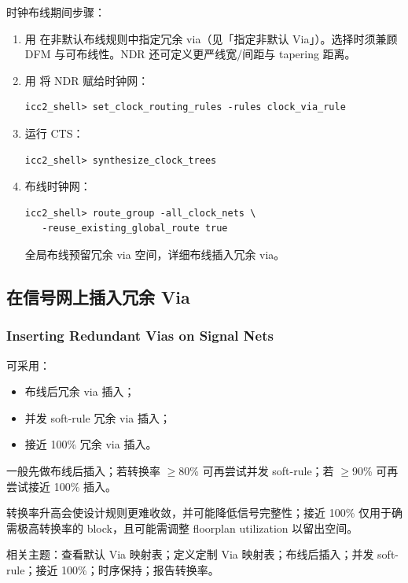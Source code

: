 时钟布线期间步骤：
\begin{enumerate}
  \item 用  在非默认布线规则中指定冗余 via（见「指定非默认 Via」）。选择时须兼顾 DFM 与可布线性。NDR 还可定义更严线宽/间距与 tapering 距离。
  \item 用  将 NDR 赋给时钟网：
\begin{lstlisting}
icc2_shell> set_clock_routing_rules -rules clock_via_rule
\end{lstlisting}
  \item 运行 CTS：
\begin{lstlisting}
icc2_shell> synthesize_clock_trees
\end{lstlisting}
  \item 布线时钟网：
\begin{lstlisting}
icc2_shell> route_group -all_clock_nets \
   -reuse_existing_global_route true
\end{lstlisting}
        全局布线预留冗余 via 空间，详细布线插入冗余 via。
\end{enumerate}

\subsection{在信号网上插入冗余 Via}
\subsubsection*{Inserting Redundant Vias on Signal Nets}

可采用：
\begin{itemize}
  \item 布线后冗余 via 插入；
  \item 并发 soft-rule 冗余 via 插入；
  \item 接近 100\% 冗余 via 插入。
\end{itemize}

一般先做布线后插入；若转换率 $\ge$80\% 可再尝试并发 soft-rule；若 $\ge$90\% 可再尝试接近 100\% 插入。

\begin{noteBox}
转换率升高会使设计规则更难收敛，并可能降低信号完整性；接近 100\% 仅用于确需极高转换率的 block，且可能需调整 floorplan utilization 以留出空间。
\end{noteBox}

相关主题：查看默认 Via 映射表；定义定制 Via 映射表；布线后插入；并发 soft-rule；接近 100\%；时序保持；报告转换率。

